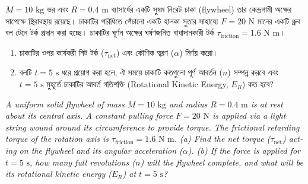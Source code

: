 \documentclass[12pt, a4paper]{article}
\begin{document}
\begin{tcolorbox}[questionbox={প্রশ্ন (Question) 20}]
\noindent
$M = 10\text{ kg}$ ভর এবং $R = 0.4\text{ m}$ ব্যাসার্ধের একটি সুষম নিরেট চাকা (flywheel) তার কেন্দ্রগামী অক্ষের সাপেক্ষে স্থিরাবস্থায় রয়েছে। চাকাটির পরিধিতে পেঁচানো একটি হালকা সুতার সাহায্যে $F = 20\text{ N}$ মানের একটি ধ্রুব বল টেনে টর্ক প্রদান করা হচ্ছে। চাকাটির ঘূর্ণন অক্ষের ঘর্ষণজনিত বাধাদানকারী টর্ক $\tau_{\text{friction}} = 1.6\text{ N m}$। 
\begin{enumerate}
    \item[(ক)] চাকাটির ওপর কার্যকরী নিট টর্ক ($\tau_{\text{net}}$) এবং কৌণিক ত্বরণ ($\alpha$) নির্ণয় করো।
    \item[(খ)] বলটি $t = 5\text{ s}$ ধরে প্রয়োগ করা হলে, ঐ সময়ে চাকাটি কতগুলো পূর্ণ আবর্তন ($n$) সম্পন্ন করবে এবং $t = 5\text{ s}$ মুহূর্তে চাকাটির আবর্ত গতিশক্তি (Rotational Kinetic Energy, $E_R$) কত হবে?
\end{enumerate}

\vspace{0.8em}
\begin{english}
\noindent\textit{\color{darkgray}
A uniform solid flywheel of mass $M = 10\text{ kg}$ and radius $R = 0.4\text{ m}$ is at rest about its central axis. A constant pulling force $F = 20\text{ N}$ is applied via a light string wound around its circumference to provide torque. The frictional retarding torque of the rotation axis is $\tau_{\text{friction}} = 1.6\text{ N m}$. 
(a) Find the net torque ($\tau_{\text{net}}$) acting on the flywheel and its angular acceleration ($\alpha$). 
(b) If the force is applied for $t = 5\text{ s}$, how many full revolutions ($n$) will the flywheel complete, and what will be its rotational kinetic energy ($E_R$) at $t = 5\text{ s}$?
}
\end{english}
\end{tcolorbox}

\vspace{1em}
\begin{center}
\end{center}
\vspace{1em}
\end{document}
